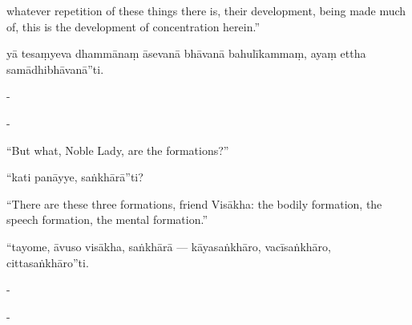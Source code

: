 \begin{samepage}
\begin{leftcolumn*}
whatever repetition of these things there is, their development, being made much of, this is the development of concentration herein.”
\end{leftcolumn*}

\begin{rightcolumn}
yā tesaṃyeva dhammānaṃ āsevanā bhāvanā bahulīkammaṃ, ayaṃ ettha samādhibhāvanā”ti.
\end{rightcolumn}
\end{samepage}

\begin{samepage}
\begin{leftcolumn*}
-
\end{leftcolumn*}

\begin{rightcolumn}
-
\end{rightcolumn}
\end{samepage}

\begin{samepage}
\begin{leftcolumn*}
“But what, Noble Lady, are the formations?”
\end{leftcolumn*}

\begin{rightcolumn}
“kati panāyye, saṅkhārā”ti?
\end{rightcolumn}
\end{samepage}

\begin{samepage}
\begin{leftcolumn*}
“There are these three formations, friend Visākha: the bodily formation, the speech formation, the mental formation.”
\end{leftcolumn*}

\begin{rightcolumn}
“tayome, āvuso visākha, saṅkhārā — kāyasaṅkhāro, vacīsaṅkhāro, cittasaṅkhāro”ti.
\end{rightcolumn}
\end{samepage}

\begin{samepage}
\begin{leftcolumn*}
-
\end{leftcolumn*}

\begin{rightcolumn}
-
\end{rightcolumn}
\end{samepage}

